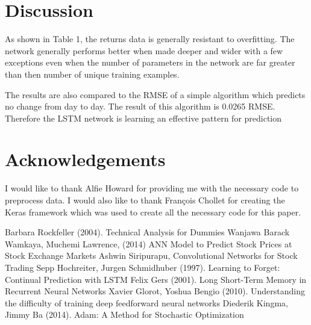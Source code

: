 \documentclass[11pt]{article}
\begin{document}
\section{Discussion}

As shown in Table 1, the returns data is generally resistant to overfitting. The network generally performs better when made deeper and wider with a few exceptions even when the number of parameters in the network are far greater than then number of unique training examples.

The results are also compared to the RMSE of a simple algorithm which predicts no change from day to day. The result of this algorithm is 0.0265 RMSE. Therefore the LSTM network is learning an effective pattern for prediction

\section*{Acknowledgements}

I would like to thank Alfie Howard for providing me with the necessary code to preprocess data. I would also like to thank Fran\c{c}ois Chollet for creating the Keras framework which was used to create all the necessary code for this paper.

\begin{thebibliography}{9}

 Barbara Rockfeller (2004). Technical Analysis for Dummies
 Wanjawa Barack Wamkaya, Muchemi Lawrence, (2014) ANN Model to Predict Stock Prices at Stock Exchange Markets
 Ashwin Siripurapu, Convolutional Networks for Stock Trading
 Sepp Hochreiter, Jurgen Schmidhuber (1997). Learning to Forget: Continual Prediction with LSTM
 Felix Gers (2001). Long Short-Term Memory in Recurrent Neural Networks
 Xavier Glorot, Yoshua Bengio (2010). Understanding the difficulty of training deep feedforward neural networks
 Diederik Kingma, Jimmy Ba (2014). Adam: A Method for Stochastic Optimization

\end{thebibliography}
\end{document}
